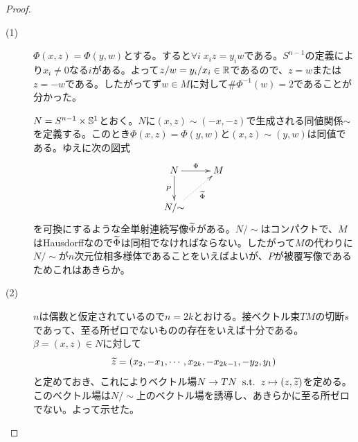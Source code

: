 \begin{proof} ${}$
  \begin{description}
    \item[(1)] $\Phi(x,z) = \Phi(y,w)$とする。すると$\forall i \; x_i z = y_i w$である。$S^{n-1}$の定義により$x_i \neq 0$なる$i$がある。よって$z/w = y_i / x_i \in {\mathbb R}$であるので、$z=w$または$z = -w$である。したがってず$w \in M$に対して$\# \Phi^{-1}(w) =2$であることが分かった。

    $N = S^{n-1} \times {\mathbb S}^1$とおく。$N$に$(x,z) \sim (-x, -z)$で生成される同値関係$\sim$を定義する。このとき$\Phi(x,z) = \Phi(y,w)$と$(x,z) \sim (y,w)$は同値である。ゆえに次の図式
    \[
    \xymatrix{
    N \ar[r]^-{\Phi} \ar[d]_-{P}  & M \\
    N/ {\sim} \ar@{.>}[ru]_-{ \wt{\Phi} }
    }
    \]
    を可換にするような全単射連続写像$\widetilde{\Phi}$がある。$N/{\sim}$はコンパクトで、$M$はHausdorffなので$\widetilde{\Phi}$は同相でなければならない。したがって$M$の代わりに$N/{\sim}$が$n$次元位相多様体であることをいえばよいが、$P$が被覆写像であるためこれはあきらか。
    \item[(2)] $n$は偶数と仮定されているので$n=2k$とおける。接ベクトル束$TM$の切断$s$であって、至る所ゼロでないものの存在をいえば十分である。$\beta = (x,z) \in N$に対して
    \[
    \widetilde{z} = (x_2, -x_1, \cdots , x_{2k}, -x_{2k-1}, -y_2, y_1)
    \]
    と定めておき、これによりベクトル場$N \to TN \; \; \text{s.t.} \; \; z \mapsto (z, \widetilde{z})$を定める。このベクトル場は$N/{\sim}$上のベクトル場を誘導し、あきらかに至る所ゼロでない。よって示せた。
  \end{description}
\end{proof}



\newpage

